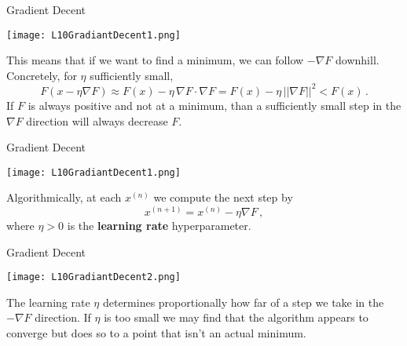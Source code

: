 \documentclass[10pt, table, dvipsnames,xcdraw, handout]{beamer}
\begin{document}
\begin{frame}[fragile]{Gradient Decent}
  \begin{minipage}[t][0.5\textheight][t]{\textwidth}
	\centering \texttt{[image: L10GradiantDecent1.png]} 
  \end{minipage}
  \vfill
\begin{minipage}[t][0.5\textheight][t]{\textwidth}
This means that if we want to find a minimum, we can follow $-\nabla F$ downhill. Concretely, for $\eta$ sufficiently small, 
$$
F(x - \eta \nabla F) \approx F(x) - \eta\, \nabla F \cdot  \nabla F  = F(x) - \eta\, ||\nabla F ||^2 < F(x) \,.
$$
If $F$ is always positive and not at a minimum, than a sufficiently small step in the $\nabla F$ direction will always decrease $F$. 
\end{minipage}
\end{frame}





\begin{frame}[fragile]{Gradient Decent}
  \begin{minipage}[t][0.5\textheight][t]{\textwidth}
	\centering \texttt{[image: L10GradiantDecent1.png]} 
  \end{minipage}
  \vfill
\begin{minipage}[t][0.5\textheight][t]{\textwidth}
Algorithmically, at each $x^{(n)}$ we compute the next step by
$$
x^{(n+1)} = x^{(n)} - \eta \nabla F\,,
$$
where $\eta > 0$ is the \textbf{learning rate} hyperparameter.  
\end{minipage}
\end{frame}




\begin{frame}[fragile]{Gradient Decent}
  \begin{minipage}[t][0.5\textheight][t]{\textwidth}
	\centering \texttt{[image: L10GradiantDecent2.png]} 
  \end{minipage}
  \vfill
\begin{minipage}[t][0.5\textheight][t]{\textwidth}
The learning rate $\eta$ determines proportionally how far of a step we take in the $-\nabla F$ direction. If $\eta$ is too small we may find that the algorithm appears to converge but does so to a point that isn't an actual minimum.
\end{minipage}
\end{frame}
\end{document}
